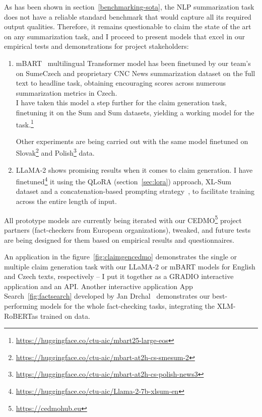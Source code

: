 As has been shown in section~\ref{benchmarking-sota}, the NLP summarization task does not have a reliable standard benchmark that would capture all its required output qualities. Therefore, it remains questionable to claim the state of the art on any summarization task, and I proceed to present models that excel in our empirical tests and demonstrations for project stakeholders:

\begin{enumerate}
    \item {\techbf mBART}~\cite{mbart} multilingual Transformer model has been finetuned by our team's~\cite{krotil} on SumeCzech and proprietary CNC News summarization dataset on the \"{full text to headline} task, obtaining encouraging scores across numerous summarization metrics in Czech.\\
    I have taken this model a step further for the claim generation task, finetuning it on the {\FCZ}Sum and {\CTK}Sum datasets, yielding a working model for the task.\footnote{
    \url{https://huggingface.co/ctu-aic/mbart25-large-eos}}

    Other experiments are being carried out with the same model finetuned on Slovak\footnote{\url{https://huggingface.co/ctu-aic/mbart-at2h-cs-smesum-2}} and Polish\footnote{\url{https://huggingface.co/ctu-aic/mbart-at2h-cs-polish-news3}} data.
    \item {\techbf LLaMA-2} shows promising results when it comes to claim generation.
    I have finetuned\footnote{\url{https://huggingface.co/ctu-aic/Llama-2-7b-xlsum-en}} it using the QLoRA (section~\ref{sec:lora}) approach, XL-Sum~\cite{xlsum} dataset and a concatenation-based prompting strategy~\cite{llama2}, to facilitate training across the entire length of input.
    
\end{enumerate}

All prototype models are currently being iterated with our CEDMO\footnote{\url{https://cedmohub.eu}} project partners (fact-checkers from European organizations),  tweaked, and future tests are being designed for them based on empirical results and questionnaires.

An application in the figure~\ref{fig:claimgencedmo} demonstrates the single or multiple claim generation task with our LLaMA-2 or mBART models for English and Czech texts, respectively -- I put it together as a GRADIO interactive application and an API.
Another interactive application App Search~\ref{fig:factsearch} developed by Jan Drchal~\cite{mlynar} demonstrates our best-performing models for the whole fact-checking tasks, integrating the XLM-RoBERTas trained on \FCZNLI data.


